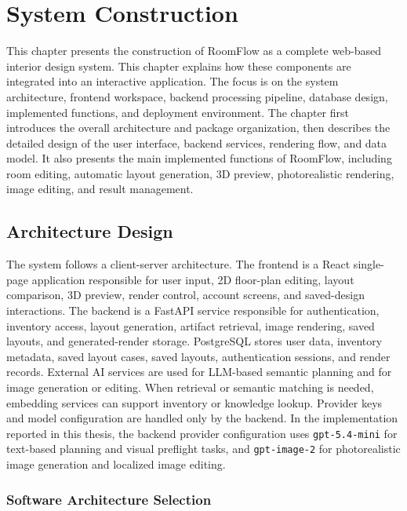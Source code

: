 \chapter{System Construction}

This chapter presents the construction of RoomFlow as a complete web-based interior design system. This chapter explains how these components are integrated into an interactive application. The focus is on the system architecture, frontend workspace, backend processing pipeline, database design, implemented functions, and deployment environment. The chapter first introduces the overall architecture and package organization, then describes the detailed design of the user interface, backend services, rendering flow, and data model. It also presents the main implemented functions of RoomFlow, including room editing, automatic layout generation, 3D preview, photorealistic rendering, image editing, and result management.

\section{Architecture Design}\label{sec:architecture-design}

The system follows a client-server architecture. The frontend is a React single-page application responsible for user input, 2D floor-plan editing, layout comparison, 3D preview, render control, account screens, and saved-design interactions. The backend is a FastAPI service responsible for authentication, inventory access, layout generation, artifact retrieval, image rendering, saved layouts, and generated-render storage. PostgreSQL stores user data, inventory metadata, saved layout cases, saved layouts, authentication sessions, and render records. External AI services are used for LLM-based semantic planning and for image generation or editing. When retrieval or semantic matching is needed, embedding services can support inventory or knowledge lookup. Provider keys and model configuration are handled only by the backend. In the implementation reported in this thesis, the backend provider configuration uses \texttt{gpt-5.4-mini} for text-based planning and visual preflight tasks, and \texttt{gpt-image-2} for photorealistic image generation and localized image editing.

\subsection{Software Architecture Selection}\label{subsec:software-architecture-selection}


